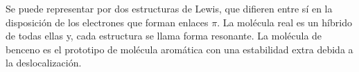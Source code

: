 Se puede representar por dos estructuras de Lewis, que difieren 
entre sí en la disposición de los electrones que forman enlaces 
$\pi$. La molécula real es un híbrido de todas ellas y, cada
estructura se llama forma resonante. La molécula de benceno es 
el prototipo de molécula aromática con una estabilidad extra 
debida a la deslocalización.